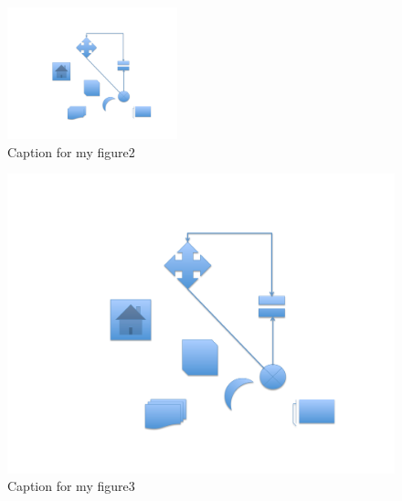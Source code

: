 \begin{figure}[h]
\centering 
\includegraphics[height=1.5in]{./pics/small}
\caption{Caption for my figure2}
\label{fig:MyFigure2}
\end{figure}

\clearpage

\begin{figure}[h]
\centering 
\includegraphics[width=6in]{./pics/my_figure}
\caption{Caption for my figure3}
\label{fig:MyFigure3}
\end{figure}



